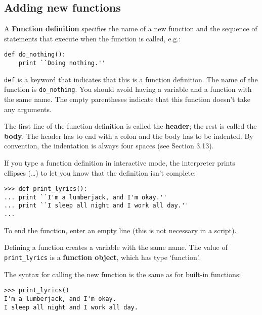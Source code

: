 \documentclass{article}
\begin{document}
\subsection{Adding new functions}
A \textbf{Function definition} specifies the name of a new
function and the sequence of statements that execute when the
function is called, e.g.:
\begin{verbatim}
def do_nothing():
    print ``Doing nothing.''
\end{verbatim}

\verb|def| is a keyword that indicates that this is a function
definition. The name of the function is \verb|do_nothing|.
You should avoid having a variable and a function with the same
name. The empty parentheses indicate that this function doesn't
take any arguments.

The first line of the function definition is called the
\textbf{header}; the rest is called the \textbf{body}. The header
has to end with a colon and the body has to be indented.
By convention, the indentation is always four spaces
(see Section 3.13).

If you type a function definition in interactive mode, the interpreter
prints ellipses (\ldots) to let you
know that the definition isn't complete:
\begin{verbatim}
>>> def print_lyrics():
... print ``I'm a lumberjack, and I'm okay.''
... print ``I sleep all night and I work all day.''
...
\end{verbatim}
To end the function, enter an empty line (this is not
necessary in a script).

Defining a function creates a variable with the same name.
The value of \verb|print_lyrics| is a \textbf{function object},
which has type `function'.

The syntax for calling the new function is the same as for
built-in functions:
\begin{verbatim}
>>> print_lyrics()
I'm a lumberjack, and I'm okay.
I sleep all night and I work all day.
\end{verbatim}

\subsection{}
\subsection{}
\subsection{}
\end{document}

